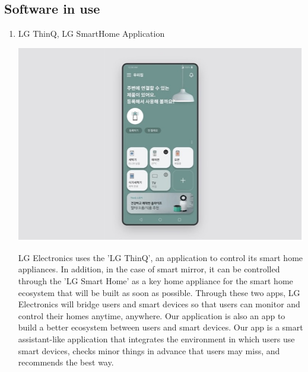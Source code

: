\documentclass[conference]{IEEEtran}
\begin{document}
\break

\subsection{Software in use}
\begin{enumerate}
    \item LG ThinQ, LG SmartHome Application\\
    \centerline{\includegraphics[scale=0.30]{assets/thinkq.jpg}}

        LG Electronics uses the 'LG ThinQ', an application to control its smart home appliances. In addition, in the case of smart mirror, it can be controlled through the 'LG Smart Home' as a key home appliance for the smart home ecosystem that will be built as soon as possible. Through these two apps, LG Electronics will bridge users and smart devices so that users can monitor and control their homes anytime, anywhere. Our application is also an app to build a better ecosystem between users and smart devices. Our app is a smart assistant-like application that integrates the environment in which users use smart devices, checks minor things in advance that users may miss, and recommends the best way. \\ \\
    

\end{enumerate}
\end{document}
